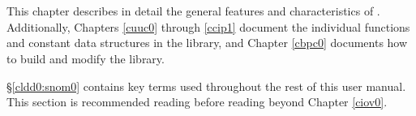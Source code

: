 \chapter[\clddzerotitleemph{}]{\clddzerolongtitleemph{}}
\chaptermark{\clddzeroshorttitlenoemph{}}
\label{cldd0}

This chapter describes in detail the general features and characteristics
of \emph{\productbasenameshort{}}\@.  Additionally, Chapters \ref{cuuc0}
through \ref{ccip1} document the individual functions and constant data
structures in the library, and Chapter \ref{cbpc0} documents how to build
and modify the library.

\S{}\ref{cldd0:snom0} contains key terms used throughout the rest of this
user manual.  This section is recommended reading before reading beyond
Chapter \ref{ciov0}.

